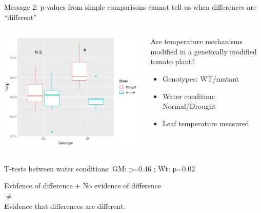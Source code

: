 \documentclass[10pt]{beamer}
\begin{document}
\begin{frame}{Message 2: p-values from simple comparisons cannot tell us when differences are “different”}
 \pause
  \begin{columns}
    \begin{column}{0.5\textwidth}
	\begin{center}
	\includegraphics[width=\textwidth]{Figures/drought}
	\end{center}
    \end{column}
    
    \begin{column}{0.5\textwidth}
    \begin{block}{Are temperature mechanisms modified in a genetically modified tomato plant?}
      \begin{itemize}
	\item Genotypes: WT/mutant 
	\item Water condition: Normal/Drought
	\item Leaf temperature measured
      \end{itemize}
      \end{block}
  
    \end{column}
  \end{columns}
   
   
   \begin{alertblock}{T-tests between water conditions:}
GM: p=0.46 ; Wt: p=0.02
   \pause
    \begin{center}
        Evidence of difference + No evidence of difference \\ $\neq$ \\ Evidence that differences are different.
    \end{center}

  \end{alertblock}
      
\end{frame}
\end{document}
